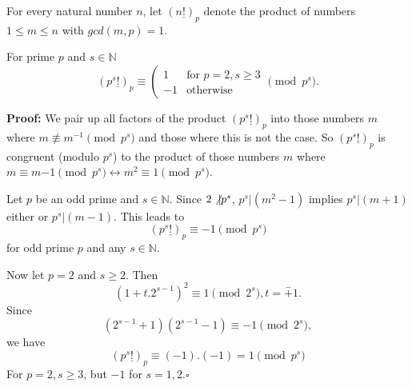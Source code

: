 \documentclass[12pt]{article}
\newcommand{\pfac}[1]{\left(#1\underline{!}\right)_p}
\begin{document}
For every natural number $n$, let $\pfac{n}$ denote the product of numbers $1
\le m \le n$ with $gcd(m,p) =1$.

For prime $p$ and $s \in \mathbb{N}$
\[\pfac{p^s} \equiv \left(
\begin{array}{ll}
1 & \mbox{for } p=2, s \ge 3 \\
-1 & \mbox{otherwise}
\end{array}\right. \pmod{p^s}.\]

\textbf{Proof:} We pair up all factors of the product $\pfac{p^s}$ into those
numbers $m$ where $m \not\equiv m^{-1} \pmod{p^s}$ and those where this is not
the case. So $\pfac{p^s}$ is congruent (modulo $p^s$) to the product of those
numbers $m$ where $m \equiv m{-1} \pmod{p^s} \leftrightarrow m^2 \equiv 1
\pmod{p^s}$.

Let $p$ be an odd prime and $s \in \mathbb{N}$. Since $2 \not\vert p^s$, $p^s
\vert (m^2 -1)$ implies $p^s \vert (m +1)$ either or $p^s \vert (m-1)$. This
leads to
\[\pfac{p^s} \equiv -1 \pmod{p^s}\]
for odd prime $p$ and any $s \in \mathbb{N}$.

Now let $p=2$ and $s \ge 2$. Then
\[\left(1 +t.2^{s-1}\right)^2 \equiv 1 \pmod{2^s}, t =\stackrel{-}{+}1.\]
Since
\[\left(2^{s -1} +1\right)\left(2^{s-1} -1\right) \equiv -1 \pmod{2^s},\]
we have
\[\pfac{p^s} \equiv (-1).(-1) =1 \pmod{p^s}\]
For $p=2, s \ge 3$, but $-1$ for $s=1,2. \square$
\end{document}

